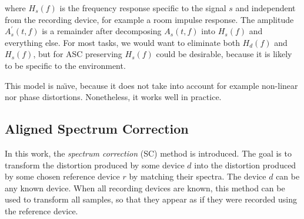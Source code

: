 \documentclass[a4paper]{article}
\newcommand{\inpos}{}
\newcommand{\va}{A}
\newcommand{\vh}{H}
\newcommand{\vs}{s}
\newcommand{\ff}{f}
\newcommand{\dr}{r}
\newcommand{\dd}{d}
\newcommand{\respf}[1]{\vh_{#1}\left(\ff\right)}
\newcommand{\magntf}[2][]{\va_{#2}^{#1}\left(t,\ff\right)}
\begin{document}
\noindent where $\respf{\vs}\inpos$ is the frequency response specific to the signal $\vs$ and independent from the recording device, for example a room impulse response. The amplitude $\magntf[\prime]{\vs}\inpos$ is a remainder after decomposing $\magntf{\vs}$ into $\respf{\vs}$ and everything else. For most tasks, we would want to eliminate both $\respf{\dd}$ and $\respf{\vs}$, but for ASC preserving $\respf{\vs}$ could be desirable, because it is likely to be specific to the environment.

This model is na\"{\i}ve, because it does not take into account for example non-linear nor phase distortions. Nonetheless, it works well in practice.





\subsection{Aligned Spectrum Correction}
\label{ssec:aligned-spectrum-correction}

In this work, the \textit{spectrum correction} (SC) method is introduced. The goal is to transform the distortion produced by some device $\dd$ into the distortion produced by some chosen reference device $\dr$ by matching their spectra. The device $\dd$ can be any known device. When all recording devices are known, this method can be used to transform all samples, so that they appear as if they were recorded using the reference device.
\end{document}
